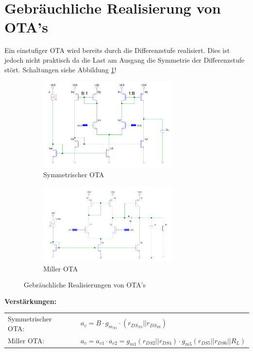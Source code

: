 \section{Gebräuchliche Realisierung von OTA's}
Ein einstufiger OTA wird bereits durch die Differenzstufe realisiert. Dies ist jedoch nicht praktisch da die Last am
Ausgang die Symmetrie der Differenzstufe stört.
Schaltungen siehe Abbildung \ref{fig:otas}!
\begin{figure}[htp]
\begin{center}
	\begin{subfigure}[b]{8cm}
		\centering
		\includegraphics[width=7cm]{images/SymetrischerOTA.png}
		\caption{Symmetrischer OTA}
	\end{subfigure}
	\begin{subfigure}[b]{8cm}
		\centering
		\includegraphics[width=7cm]{images/millerOTA.png}
		\caption{Miller OTA}
	\end{subfigure}
	\caption{Gebräuchliche Realisierungen von OTA's}
	\label{fig:otas}
\end{center}
\end{figure}

\textbf{Verstärkungen:} \\
\begin{tabular}{lll}
	Symmetrischer OTA:	& & $a_v = B \cdot g_{m_{N1}} \cdot (r_{DS_{N3}} || r_{DS_{P3}})$ \\
	Miller OTA:			& & $a_v = a_{v1} \cdot a_{v2} = g_{m1}(r_{DS2} || r_{DS4}) \cdot g_{m5}(r_{DS5} || r_{DS6} || R_L)$
\end{tabular}
